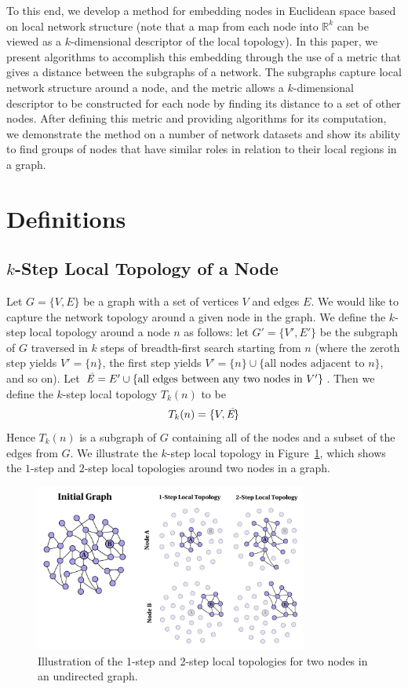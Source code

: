 \documentclass{article}
\begin{document}
To this end, we develop a method for embedding nodes in Euclidean space based on local network structure (note that a map from each node into $\mathbb{R}^{k}$ can be viewed as a $k$-dimensional descriptor of the local topology). In this paper, we present algorithms to accomplish this embedding through the use of a metric that gives a distance between the subgraphs of a network. The subgraphs capture local network structure around a node, and the metric allows a $k$-dimensional descriptor to be constructed for each node by finding its distance to a set of other nodes. After defining this metric and providing algorithms for its computation, we demonstrate the method on a number of network datasets and show its ability to find groups of nodes that have similar roles in relation to their local regions in a graph. 


\section{Definitions}
\label{sec:defs}

\subsection{$k$-Step Local Topology of a Node}
Let $G = \{V,E\}$ be a graph with a set of vertices $V$ and edges $E$. We would like to capture the network topology around a given node in the graph. We define the $k$-step local topology around a node $n$ as follows: let $G' = \{ V',E' \}$ be the subgraph of $G$ traversed in $k$ steps of breadth-first search starting from $n$ (where the zeroth step yields $V' = \{ n \}$, the first step yields $V' = \{ n \} \cup \{ \text{all nodes adjacent to } n \} $, and so on). Let $ \text{\emph{\~{E}}} = E' \cup \{\text{all edges between any two nodes in } V' \}$. Then we define the $k$-step local topology $T_{k}(n)$ to be
\begin{equation}
T_{k}(n) = \{ V, \emph{\text{\~{E}}} \}
\end{equation}
Hence $T_{k}(n)$ is a subgraph of $G$ containing all of the nodes and a subset of the edges from $G$. We illustrate the $k$-step local topology in Figure~\ref{fig:localTopology}, which shows the $1$-step and $2$-step local topologies around two nodes in a graph.
\begin{figure}[h!tbp]
  \centering               
  \includegraphics[width=0.8\textwidth]{fig/fig1.pdf}
  \caption{Illustration of the 1-step and 2-step local topologies for two nodes in an undirected graph.}
  \label{fig:localTopology}
\end{figure}
\end{document}
